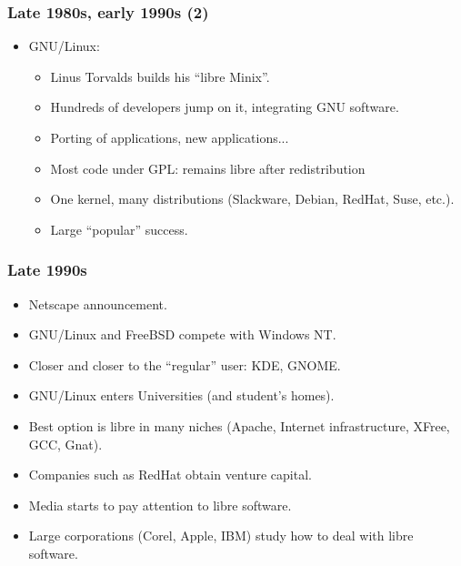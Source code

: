 
 \begin{frame}
 \frametitle{Late 1980s, early 1990s (2)}

 \begin{itemize}
 \item GNU/Linux:
   \begin{itemize}
   \item Linus Torvalds builds his ``libre Minix''.
   \item Hundreds of developers jump on it, integrating GNU software.
   \item Porting of applications, new applications...
   \item Most code under GPL: remains libre after redistribution
   \item One kernel, many distributions (Slackware, Debian, RedHat,
     Suse, etc.).
   \item Large ``popular'' success.
   \end{itemize}
 \end{itemize}

 \end{frame}


 \begin{frame}
 \frametitle{Late 1990s}

 \begin{itemize}
 \item Netscape announcement.
 \item GNU/Linux and FreeBSD compete with Windows NT.
 \item Closer and closer to the ``regular'' user: KDE, GNOME.
 \item GNU/Linux enters Universities (and student's homes).
 \item Best option is libre in many niches (Apache,
   Internet infrastructure, XFree, GCC, Gnat).
 \item Companies such as RedHat obtain venture capital.
 \item Media starts to pay attention to libre software.
 \item Large corporations (Corel, Apple, IBM) study how to deal with
   libre software.
 \end{itemize}

 \end{frame}


